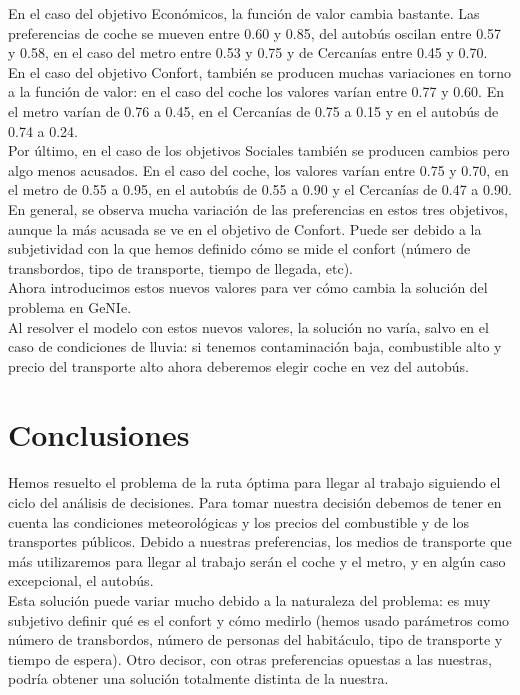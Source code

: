 \documentclass[12pt,a4paper,twoside,openright,titlepage,final]{article}
\begin{document}
En el caso del objetivo Económicos, la función de valor cambia bastante. Las preferencias de coche se mueven entre 0.60 y 0.85, del autobús oscilan entre 0.57 y 0.58, en el caso del metro entre 0.53 y 0.75 y de Cercanías entre 0.45 y 0.70.\\

En el caso del objetivo Confort, también se producen muchas variaciones en torno a la función de valor: en el caso del coche los valores varían entre 0.77 y 0.60. En el metro varían de 0.76 a 0.45, en el Cercanías de 0.75 a 0.15 y en el autobús de 0.74 a 0.24.\\

Por último, en el caso de los objetivos Sociales también se producen cambios pero algo menos acusados. En el caso del coche, los valores varían entre 0.75 y 0.70, en el metro de 0.55 a 0.95, en el autobús de 0.55 a 0.90 y el Cercanías de 0.47 a 0.90.\\

En general, se observa mucha variación de las preferencias en estos tres objetivos, aunque la más acusada se ve en el objetivo de Confort. Puede ser debido a la subjetividad con la que hemos definido cómo se mide el confort (número de transbordos, tipo de transporte, tiempo de llegada, etc).\\

Ahora introducimos estos nuevos valores para ver cómo cambia la solución del problema en GeNIe.\\

Al resolver el modelo con estos nuevos valores, la solución no varía, salvo en el caso de condiciones de lluvia: si tenemos contaminación baja, combustible alto y precio del transporte alto ahora deberemos elegir coche en vez del autobús.

\section{Conclusiones}

Hemos resuelto el problema de la ruta óptima para llegar al trabajo siguiendo el ciclo del análisis de decisiones. Para tomar nuestra decisión debemos de tener en cuenta las condiciones meteorológicas y los precios del combustible y de los transportes públicos. Debido a nuestras preferencias, los medios de transporte que más utilizaremos para llegar al trabajo serán el coche y el metro, y en algún caso excepcional, el autobús.\\

Esta solución puede variar mucho debido a la naturaleza del problema: es muy subjetivo definir qué es el confort y cómo medirlo (hemos usado parámetros como número de transbordos, número de personas del habitáculo, tipo de transporte y tiempo de espera). Otro decisor, con otras preferencias opuestas a las nuestras, podría obtener una solución totalmente distinta de la nuestra.\\
\end{document}
